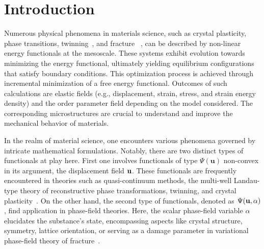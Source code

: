 

\section{Introduction}
Numerous physical phenomena in materials science, such as crystal plasticity, phase transitions, twinning~\cite{Clayton2011-xq}, and fracture ~\cite{Baldelli2014-ho,Baldelli2021-gc}, can be described by non-linear energy functionals at the mesoscale. These systems exhibit evolution towards minimizing the energy functional, ultimately yielding equilibrium configurations that satisfy boundary conditions. This optimization process is achieved through incremental minimization of a free energy functional. Outcomes of such calculations are elastic fields
(e.g., displacement, strain, stress, and strain energy density) and the order parameter field depending on the model considered. The corresponding microstructures are crucial to understand and improve the mechanical behavior of materials.

In the realm of material science, one encounters various phenomena governed by intricate mathematical formulations. Notably, there are two distinct types of functionals at play here. First one involves functionals of type $\Psi(\mathbf u)$ non-convex in its argument, the displacement field $\bold u$. These functionals are frequently encountered in theories such as quasi-continuum methods, the multi-well Landau-type theory of reconstructive phase transformations, twinning, and crystal plasticity~\cite{Tadmor1996-qi,Conti2004-yj,Clayton2011-xq,Baggio2019-rs,Baggio2023-qu}. On the other hand, the second type of functionals, denoted as $\Psi(\bold u, \alpha)$, find application in phase-field theories. Here, the scalar phase-field variable $\alpha$ elucidates the substance's state, encompassing aspects like crystal structure, symmetry, lattice orientation, \cite{Finel2010-zw,Ruffini2015-pn,Javanbakht2016-dr} or serving as a damage parameter in variational phase-field theory of fracture~\cite{francfort_marigo1998,Salman2021-mn}. 

